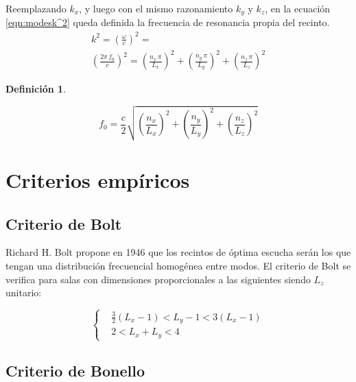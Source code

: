 \documentclass[a5paper,12pt,twoside]{book}
\newtheorem{defn}{{Definición}}[chapter]
\begin{document}
Reemplazando $k_x$, y luego con el mismo razonamiento $k_y$ y $k_z$, en la ecuación \ref{eqn:modesk^2} queda definida la frecuencia de resonancia propia del recinto.
\begin{gather*}
    k^2 = \left( \frac{\omega}{c} \right)^2 =
    \\
    \left( \frac{2\pi\,f_0}{c} \right)^2
    = \left( \frac{n_x \, \pi}{L_x} \right)^2 + \left( \frac{n_y \, \pi}{L_y} \right)^2 + \left( \frac{n_z \, \pi}{L_z} \right)^2
\end{gather*}

\begin{mdframed}[style=MyFrame1]
    \begin{defn}
    \end{defn}
    \begin{equation*}
        f_0 = \frac{c}{2} \sqrt{\left(\frac{n_x}{L_x}\right)^2 + \left(\frac{n_y}{L_y}\right)^2 + \left(\frac{n_z}{L_z}\right)^2}
    \end{equation*}
\end{mdframed}


\section{Criterios empíricos}


\subsection{Criterio de Bolt}

Richard H. Bolt propone en 1946 que los recintos de óptima escucha serán los que tengan una distribución frecuencial homogénea entre modos. El criterio de Bolt se verifica para salas con dimensiones proporcionales a las siguientes siendo $L_z$ unitario:

\begin{equation*}
    \left\{
    \begin{aligned}
        & \frac{3}{2} \left( L_x-1 \right) < L_y -1 < 3 \left( L_x-1 \right)
        \\
        & 2 < L_x+L_y < 4
    \end{aligned}
    \right.
\end{equation*}


\subsection{Criterio de Bonello}
\end{document}
